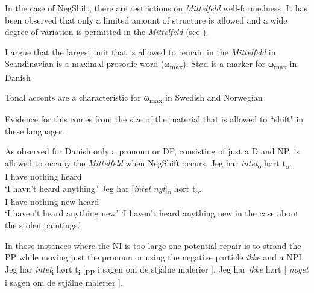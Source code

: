 \documentclass[12pt, letterpaper]{article}
\newcommand{\sub}[1]{\textsubscript{#1}}
\begin{document}
\ex In the case of NegShift, there are restrictions on \emph{Mittelfeld} well-formedness. 
	\ea It has been observed that only a limited amount of structure is allowed and a wide degree of variation is permitted in the \emph{Mittelfeld} (see \cite{haiderMittelfeldPhenomenaScrambling2017}). 

	\ex I argue that the largest unit that is allowed to remain in the \emph{Mittelfeld} in Scandinavian is a maximal prosodic word (ω\sub{max}).
		\ea Stød is a marker for ω\sub{max} in Danish \citep{basbollPhonologyDanish2005,kalivodaProsodicRecursionPseudocyclicity2018}
	
		\ex Tonal accents are a characteristic for ω\sub{max} in Swedish and Norwegian \citep{kristoffersenPhonologyNorwegian2007,myrbergProsodicWordSwedish2013,myrbergProsodicHierarchySwedish2015,riadPhonologySwedish2014}

		\z  

	\z 

\ex Evidence for this comes from the size of the material that is allowed to ``shift" in these languages. 

	\ea As observed for Danish only a pronoun or DP, consisting of just a D and NP, is allowed to occupy the \emph{Mittelfeld} when NegShift occurs. 
		\ea 
		\gll Jeg har \textit{intet}\textsubscript{o} hørt t\textsubscript{o}.\\
		I have nothing heard\\
		\glt  `I havn't heard anything.'
		\ex 
		\gll Jeg har [\textit{intet} \textit{nyt}]\textsubscript{o} hørt t\textsubscript{o}.\\
		I have nothing new heard\\
		\glt `I haven't heard anything new'
		\glt `I haven't heard anything new in the case about the stolen paintings.'
	\z

	\ex In those instances where the NI is too large one potential repair is to strand the PP while moving just the pronoun or using the negative particle \textit{ikke} and a NPI.
		\ea Jeg har \textit{intet}\textsubscript{i} hørt t\textsubscript{i} [\textsubscript{PP} i sagen om de stjålne malerier ].
		\ex Jeg har \textit{ikke} hørt [ \textit{noget} i sagen om de stjålne malerier ].
		\z 
 
\end{document}
